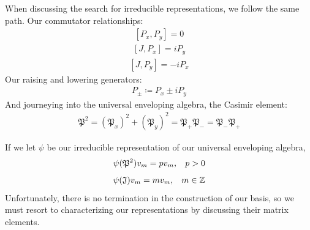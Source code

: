 \documentclass[compress,aspectratio=169,10pt,usenames,dvipsnames]{beamer}
\newcommand{\Z}{\mathbb{Z}}
\begin{document}
\begin{frame}
When discussing the search for irreducible representations, we follow the same path.
\vfill
Our commutator relationships:
\begin{equation}
\begin{aligned}
	[P_x,P_y] = 0
\end{aligned}
\end{equation}
\begin{equation}
\begin{aligned}
	[J,P_x] = iP_y
\end{aligned}
\end{equation}
\begin{equation}
\begin{aligned}
	[J,P_y] = -iP_x
\end{aligned}
\end{equation}
\vfill
Our raising and lowering generators:
\begin{equation}
\begin{aligned}
	P_\pm \coloneq P_x \pm iP_y
\end{aligned}
\end{equation}
\vfill
And journeying into the universal enveloping algebra, the Casimir element:
\begin{equation}
\begin{aligned}
	\mathfrak{P}^2 = (\mathfrak{P}_x)^2 + (\mathfrak{P}_y)^2 = \mathfrak{P}_+\mathfrak{P}_- = \mathfrak{P}_-\mathfrak{P}_+
\end{aligned}
\end{equation}
\vfill
\end{frame}
%
%
\begin{frame}
\vfill
If we let $\psi$ be our irreducible representation of our universal enveloping algebra,
\begin{equation}
\begin{aligned}
	 \psi(\mathfrak{P}^2)v_m = pv_m,\hspace{3mm} p>0
\end{aligned}
\end{equation}
\begin{equation}
\begin{aligned}
	 \psi(\mathfrak{J})v_m = mv_m, \hspace{3mm} m\in\Z
\end{aligned}
\end{equation}
\vfill 
Unfortunately, there is no termination in the construction of our basis, so we must resort to characterizing our representations by discussing their matrix elements.
\vfill
\end{frame}
\end{document}
